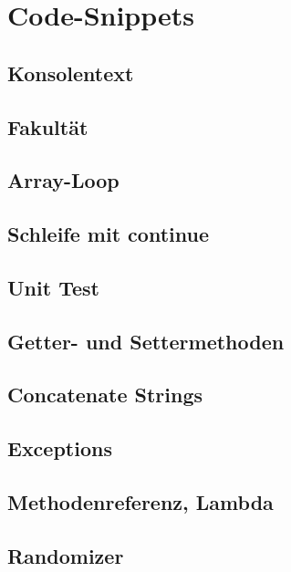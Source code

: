 \section{Code-Snippets}

\subsection{Konsolentext}
    

\subsection{Fakultät}
    

\subsection{Array-Loop}{\label{Array-Loop}}
    

\subsection{Schleife mit continue}
    

\subsection{Unit Test}{\label{Unit-Test}}
    

\subsection{Getter- und Settermethoden}{\label{GetSet}}
    

\subsection{Concatenate Strings}
    

\subsection{Exceptions}
    

\subsection{Methodenreferenz, Lambda}\label{Lambdas}
    

\subsection{Randomizer}
    